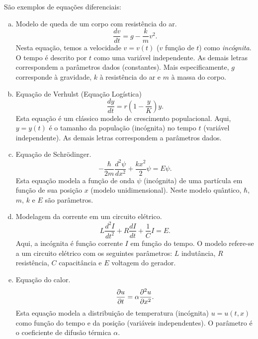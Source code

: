 \begin{ex}\label{ex:ed}
  São exemplos de equações diferenciais:
  \begin{enumerate}[a)]
  \item Modelo de queda de um corpo com resistência do ar.
    \begin{equation}\label{eq:ex_ed_queda}
      \frac{dv}{dt} = g - \frac{k}{m}v^2.
    \end{equation}
    Nesta equação, temos a velocidade $v = v(t)$ ($v$ função de $t$) como \emph{incógnita}. O tempo é descrito por $t$ como uma variável independente. As demais letras correspondem a parâmetros dados (constantes). Mais especificamente, $g$ corresponde à gravidade, $k$ à resistência do ar e $m$ à massa do corpo.
  \item Equação de Verhulst (Equação Logística)
    \begin{equation}\label{eq:ex_ed_Verhulst}
      \frac{dy}{dt} = r\left(1 - \frac{y}{K}\right)y.
    \end{equation}
    Esta equação é um clássico modelo de crescimento populacional. Aqui, $y = y(t)$ é o tamanho da população (incógnita) no tempo $t$ (variável independente). As demais letras correspondem a parâmetros dados.
  \item Equação de Schrödinger.
    \begin{equation}\label{eq:ex_ed_Schroedinger}
      -\frac{\hbar}{2m}\frac{d^2\psi}{dx^2} + \frac{kx^2}{2}\psi = E\psi.
    \end{equation}
    Esta equação modela a função de onda $\psi$ (incógnita) de uma partícula em função de sua posição $x$ (modelo unidimensional). Neste modelo quântico, $\hbar$, $m$, $k$ e $E$ são parâmetros.
  \item Modelagem da corrente em um circuito elétrico.
    \begin{equation}
      L\frac{d^2I}{dt^2} + R\frac{dI}{dt} + \frac{1}{C}I = E.
    \end{equation}
    Aqui, a incógnita é função corrente $I$ em função do tempo. O modelo refere-se a um circuito elétrico com os seguintes parâmetros: $L$ indutância, $R$ resistência, $C$ capacitância e $E$ voltagem do gerador.
  \item Equação do calor.
    \begin{equation}
      \frac{\partial u}{\partial t} = \alpha\frac{\partial^2 u}{\partial x^2}.
    \end{equation}
    Esta equação modela a distribuição de temperatura (incógnita) $u = u(t,x)$ como função do tempo e da posição (variáveis independentes). O parâmetro é o coeficiente de difusão térmica $\alpha$.
  \end{enumerate}
\end{ex}

